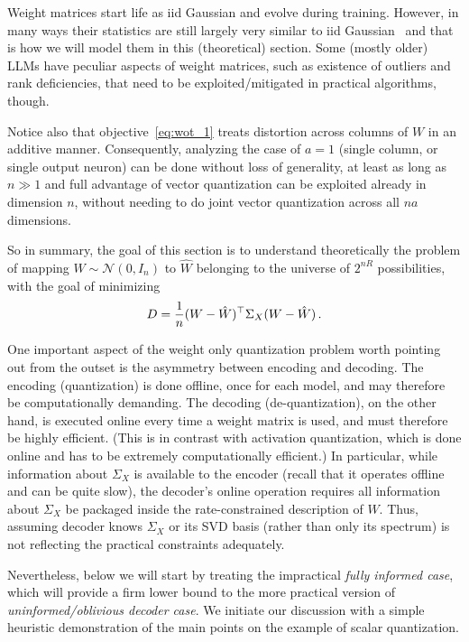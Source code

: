\documentclass[journal]{IEEEtran}
\begin{document}
Weight matrices start life as iid Gaussian and evolve during training. However, in many ways their
statistics are still largely very similar to iid Gaussian~\cite[Appendix]{lifar2026watersic} and that is how we will model them in this
(theoretical) section. Some (mostly older) LLMs have peculiar aspects of weight matrices, such as
existence of outliers and rank deficiencies, that need to be exploited/mitigated in practical
algorithms, though.


Notice also that objective~\eqref{eq:wot_1} treats distortion across columns of $W$ in an additive
manner. Consequently, analyzing the case of $a=1$ (single column, or single output neuron) can be
done without loss of generality, at least as long as $n\gg1$ and full advantage of vector
quantization can be exploited already in dimension $n$, without needing to do joint vector
quantization across all $na$ dimensions.

So in summary, the goal of this section is to understand theoretically the problem of mapping
$W \sim \mathcal{N}(0, I_n)$ to $\hat W$ belonging to the universe of $2^{nR}$ possibilities, with
the goal of minimizing
\begin{align}
D = {1\over n} (W-\hat W)^\top \Sigma_X (W-\hat W)\,.
\label{eq:DwmseDef}
\end{align} 


One important aspect of the weight only quantization problem worth pointing out from the outset is
the asymmetry between encoding and decoding. The encoding (quantization) is done offline, once for
each model, and may therefore be computationally demanding. The decoding (de-quantization), on the
other hand, is executed online every time a weight matrix is used, and must therefore be highly
efficient. (This is in contrast with activation quantization, which is done online and has to be
extremely computationally efficient.) In particular, while information about $\Sigma_X$ is
available to the encoder (recall that it operates offline and can be quite slow), the decoder's
online operation requires all information about $\Sigma_X$ be packaged inside the rate-constrained
description of $W$. Thus, assuming decoder knows $\Sigma_X$ or its SVD basis (rather than only its
spectrum) is not reflecting the practical constraints adequately.

Nevertheless, below we will start by treating the impractical \textit{fully informed case},
which will provide a firm lower bound to the more practical version of \textit{uninformed/oblivious decoder
case}. We initiate our discussion with a simple heuristic demonstration of the main points on the
example of scalar quantization.
\end{document}
